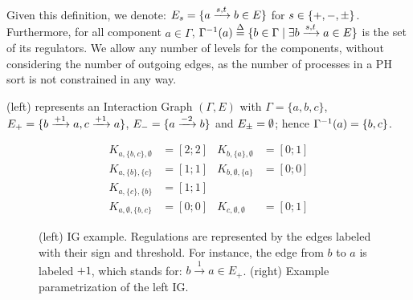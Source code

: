 Given this definition, we denote:
$E_s = \{ a \xrightarrow{s, t} b \in E \}$
for $s \in \{ +, -, \pm \}$.
Furthermore,
for all component $a \in \Gamma$, 
$\Gamma^{-1}(a) \stackrel{\Delta}= \{ b\in\Gamma\mid \exists b \xrightarrow{s, t} a \in E \}$
is the set of its regulators.
We allow any number of levels for the components, without considering the number of outgoing edges,
as the number of processes in a PH sort is not constrained in any way.

\begin{example*}
(left) represents an Interaction Graph $(\Gamma,E)$ with
$\Gamma = \{a, b, c\}$,
$E_+ = \{b \xrightarrow{+ 1} a, c \xrightarrow{+ 1} a\}$,
$E_- = \{a \xrightarrow{- 2} b\}$ and
$E_\pm = \emptyset$;
hence $\Gamma^{-1}(a) = \{b, c\}$.
\end{example*}

\begin{figure}[t]
\begin{minipage}{0.4\linewidth}
\centering
{}
\end{minipage}
\begin{minipage}{0.6\linewidth}
\centering
\begin{align*}
K_{a,\{b,c\},\emptyset} &= [2 ; 2] & K_{b,\{a\},\emptyset} &= [0 ; 1] \\
K_{a,\{b\},\{c\}} &= [1 ; 1] & K_{b,\emptyset,\{a\}} &= [0 ; 0] \\
K_{a,\{c\},\{b\}} &= [1 ; 1] &&\\
K_{a,\emptyset,\{b,c\}} &= [0 ; 0] & K_{c,\emptyset,\emptyset} &= [0 ; 1]
\end{align*}
\end{minipage}
\caption{\label{fig:runningBRN}
(left)
IG example.
Regulations are represented by the edges labeled with their sign and threshold.
For instance, the edge from $b$ to $a$ is labeled $+1$, which stands for: $b \xrightarrow{1} a \in
E_+$.
(right)
Example parametrization of the left IG.
}
\end{figure}

